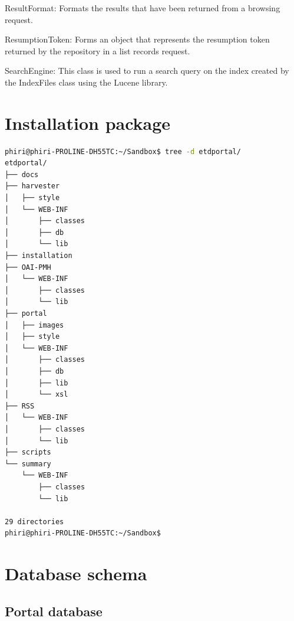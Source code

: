 \documentclass[a4paper,11pt]{article}
\begin{document}
ResultFormat: Formats the results that have been returned from a browsing request.

ResumptionToken: Forms an object that represents the resumption token returned by the repository in a list records request.

SearchEngine: This class is used to run a search query on the index created by the IndexFiles class using the Lucene library.

\appendix

\section{Installation package}

\begin{lstlisting}[language=bash]
phiri@phiri-PROLINE-DH55TC:~/Sandbox$ tree -d etdportal/
etdportal/
├── docs
├── harvester
│   ├── style
│   └── WEB-INF
│       ├── classes
│       ├── db
│       └── lib
├── installation
├── OAI-PMH
│   └── WEB-INF
│       ├── classes
│       └── lib
├── portal
│   ├── images
│   ├── style
│   └── WEB-INF
│       ├── classes
│       ├── db
│       ├── lib
│       └── xsl
├── RSS
│   └── WEB-INF
│       ├── classes
│       └── lib
├── scripts
└── summary
    └── WEB-INF
        ├── classes
        └── lib

29 directories
phiri@phiri-PROLINE-DH55TC:~/Sandbox$  
\end{lstlisting}


\section{Database schema}

\subsection{Portal database}
\end{document}
